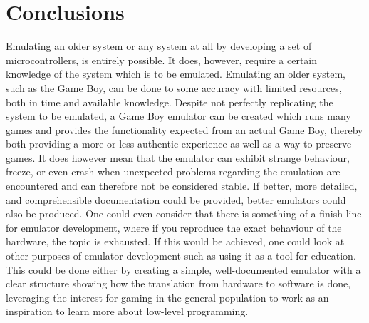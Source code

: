 \chapter{Conclusions}
Emulating an older system or any system at all by developing a set of microcontrollers, is entirely possible. It does, however, require a certain knowledge of the system which is to be emulated. Emulating an older system, such as the Game Boy, can be done to some accuracy with limited resources, both in time and available knowledge. Despite not perfectly replicating the system to be emulated, a Game Boy emulator can be created which runs many games and provides the functionality expected from an actual Game Boy, thereby both providing a more or less authentic experience as well as a way to preserve games. It does however mean that the emulator can exhibit strange behaviour, freeze, or even crash when unexpected problems regarding the emulation are encountered and can therefore not be considered stable. If better, more detailed, and comprehensible documentation could be provided, better emulators could also be produced. One could even consider that there is something of a finish line for emulator development, where if you reproduce the exact behaviour of the hardware, the topic is exhausted. If this would be achieved, one could look at other purposes of emulator development such as using it as a tool for education. This could be done either by creating a simple, well-documented emulator with a clear structure showing how the translation from hardware to software is done, leveraging the interest for gaming in the general population to work as an inspiration to learn more about low-level programming.
